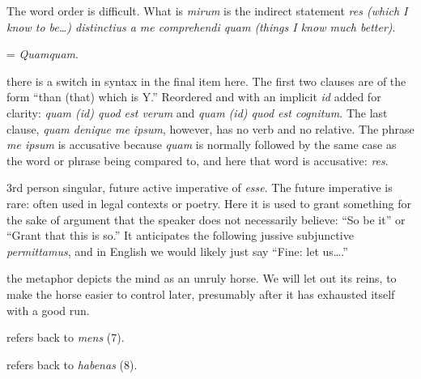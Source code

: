  The word order is difficult. What is \textit{mirum} is the indirect statement \textit{res (which I know to be\dots) distinctius a me comprehendi quam (things I know much better)}.

 = \textit{Quamquam}.

 there is a switch in syntax in the final item here. The first two clauses are  of the form ``than (that) which is Y.'' Reordered and with an implicit \textit{id} added for clarity: \textit{quam (id) quod est verum} and \textit{quam (id) quod est cognitum}. The last clause, \textit{quam denique me ipsum}, however, has no verb and no relative. The phrase \textit{me ipsum} is accusative because \textit{quam} is normally followed by the same case as the word or phrase being compared to, and here that word is accusative: \textit{res}.

 3rd person singular, future active imperative of \textit{esse}. The future imperative is rare: often used in legal contexts or poetry. Here it is used to grant something for the sake of argument that the speaker does not necessarily believe: ``So be it'' or ``Grant that this is so.'' It anticipates the following jussive subjunctive \textit{permittamus}, and in English we would likely just say ``Fine: let us\dots.''

 the metaphor depicts the mind as an unruly horse. We will let out its reins, to make the horse easier to control later, presumably after it has exhausted itself with a good run.

 refers back to \textit{mens} (7).

 refers back to \textit{habenas} (8).

\clearpage

